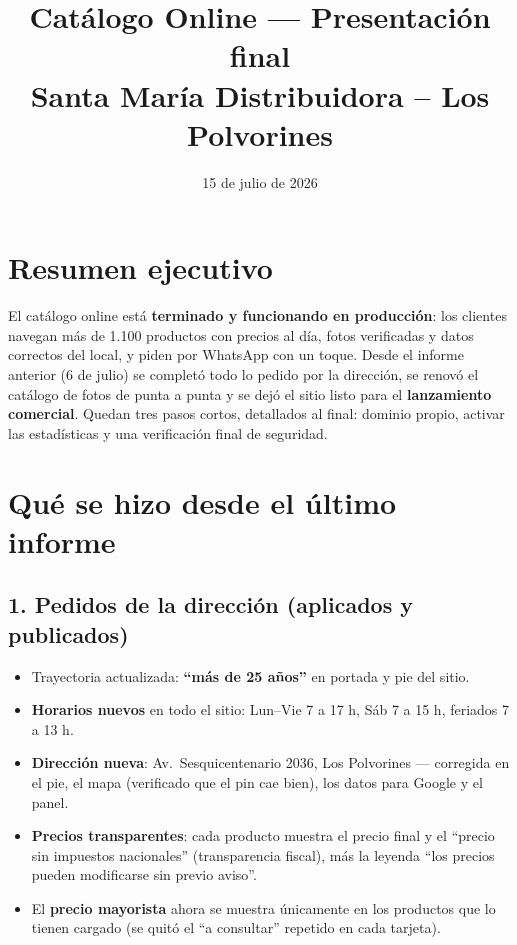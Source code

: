 \documentclass[a4paper,11pt]{article}
\title{\color{vino}\textbf{Cat\'alogo Online --- Presentaci\'on final}\\[4pt]
\large Santa Mar\'ia Distribuidora \--- Los Polvorines}
\author{}
\date{15 de julio de 2026}
\begin{document}
\maketitle
\vspace{-2.5em}

\section*{Resumen ejecutivo}

El cat\'alogo online est\'a \textbf{terminado y funcionando en producci\'on}: los clientes
navegan m\'as de 1.100 productos con precios al d\'ia, fotos verificadas y datos correctos
del local, y piden por WhatsApp con un toque. Desde el informe anterior (6 de julio) se
complet\'o todo lo pedido por la direcci\'on, se renov\'o el cat\'alogo de fotos de punta a
punta y se dej\'o el sitio listo para el \textbf{lanzamiento comercial}. Quedan tres pasos
cortos, detallados al final: dominio propio, activar las estad\'isticas y una verificaci\'on
final de seguridad.

\section{Qu\'e se hizo desde el \'ultimo informe}

\subsection*{1. Pedidos de la direcci\'on (aplicados y publicados)}
\begin{itemize}[leftmargin=1.2em, itemsep=2pt]
  \item Trayectoria actualizada: \textbf{``m\'as de 25 a\~nos''} en portada y pie del sitio.
  \item \textbf{Horarios nuevos} en todo el sitio: Lun--Vie 7 a 17 h, S\'ab 7 a 15 h, feriados 7 a 13 h.
  \item \textbf{Direcci\'on nueva}: Av.\ Sesquicentenario 2036, Los Polvorines --- corregida en
        el pie, el mapa (verificado que el pin cae bien), los datos para Google y el panel.
  \item \textbf{Precios transparentes}: cada producto muestra el precio final y el
        ``precio sin impuestos nacionales'' (transparencia fiscal), m\'as la leyenda
        ``los precios pueden modificarse sin previo aviso''.
  \item El \textbf{precio mayorista} ahora se muestra \'unicamente en los productos que lo
        tienen cargado (se quit\'o el ``a consultar'' repetido en cada tarjeta).
\end{itemize}
\end{document}
